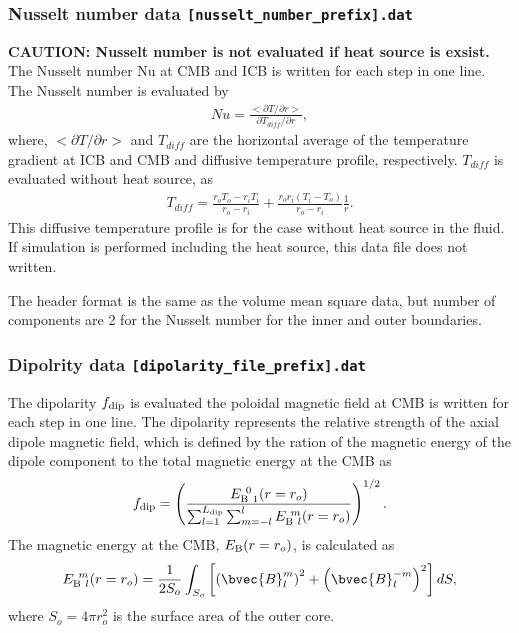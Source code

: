 \subsubsection{Nusselt number data {\tt [nusselt\_number\_prefix].dat}}
{\bf CAUTION: Nusselt number is not evaluated if heat source is exsist.}
The Nusselt number Nu at CMB and ICB is written for each step in one line. The Nusselt number is evaluated by
%
\begin{eqnarray*}
Nu = \frac{<\partial T / \partial r>}{\partial T_{diff}/ \partial r},
\end{eqnarray*}
where, $<\partial T / \partial r>$ and $T_{diff}$ are the horizontal average of the temperature gradient at ICB and CMB and diffusive temperature profile, respectively. $T_{diff}$ is evaluated without heat source, as
\begin{eqnarray*}
T_{diff} = \frac{r_{o}T_{o} - r_{i}T_{i}}{r_{o} - r_{i}}
    +  \frac{r_{o}r_{i}\left(T_{i} - T_{o}\right)}{r_{o} - r_{i}} \frac{1}{r}.
\end{eqnarray*}
%
This diffusive temperature profile is for the case without heat source in the fluid. If simulation is performed including the heat source, this data file does not written.

The header format is the same as the volume mean square data, but number of components are 2 for the Nusselt number for the inner and outer boundaries.

\subsubsection{Dipolrity data {\tt [dipolarity\_file\_prefix].dat}}
The dipolarity $f_{\rm dip}$ is evaluated the poloidal magnetic field at CMB is written for each step in one line. The dipolarity represents the relative strength of the axial dipole magnetic field, which is defined by the ration of the magnetic energy of the dipole component to the total magnetic energy at the CMB as
%
\begin{equation}
f_{\rm dip} = 
\left(
\frac{E_{{\rm B}\ 1}^{\ 0} (r=r_o)}
     {\sum_{l=1}^{L_{\rm dip}}
      \sum_{m=-l}^l E_{{\rm B}\ l}^{\ m} (r=r_o)}
\right)^{1/2}.
\label{eq:f_dip}
\end{equation}
%
The magnetic energy at the CMB, $E_{\rm B} (r=r_o)$, is calculated as
%
\begin{equation}
E_{{\rm B}\ l}^{\ m} (r=r_o) = 
  \frac{1}{2S_o} \int_{S_o} \left[
  \left(\bvec{B}_{l}^{m} \right)^2 + \left(\bvec{B}_{l}^{-m} \right)^2 \right] dS,
\end{equation}
%
where $S_o = 4\pi r_o^2$ is the surface area of the outer core.

